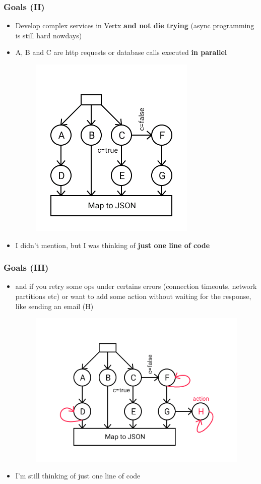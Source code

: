 \documentclass{beamer}
\begin{document}
\begin{frame}
\frametitle{Goals (II)}    
    \begin{itemize}
    \item<1->  Develop complex services in Vertx \textbf{and not die trying} (async programming is still hard nowdays)
    \item<2->  A, B and C are http requests or database calls executed \textbf{in parallel} 
   \begin{figure}\includegraphics[scale=0.4]{images/flow-1.png}\end{figure}
     \item<3->  I didn't mention, but I was thinking of \textbf{just one line of code}
     \end{itemize}      
\end{frame} 


\begin{frame}
\frametitle{Goals (III)}    
 \begin{itemize}
    \item<1-> and if you retry some ops under certains errors (connection timeouts, network partitions etc) or want to add some action without waiting for the response, like sending an email (H)
    \begin{figure}
\includegraphics[scale=0.4]{images/flow-2.png}
\end{figure}
     \item<2->  I'm still thinking of just one line of code
     \end{itemize}    
\end{frame} 
\end{document}
